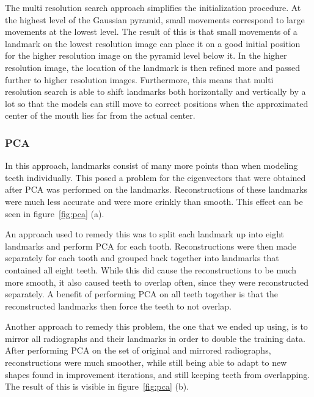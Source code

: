 \documentclass[a4paper]{article}
\begin{document}
The multi resolution search approach simplifies the initialization procedure. 
At the highest level of the Gaussian pyramid, small movements correspond to large movements at the lowest level. 
The result of this is that small movements of a landmark on the lowest resolution image can place it on a good initial position for the higher resolution image on the pyramid level below it. In the higher resolution image, the location of the landmark is then refined more and passed further to higher resolution images.
Furthermore, this means that multi resolution search is able to shift landmarks both horizontally and vertically by a lot so that the models can still move to correct positions when the approximated center of the mouth lies far from the actual center.

\subsubsection{PCA}
In this approach, landmarks consist of many more points than when modeling teeth individually. 
This posed a problem for the eigenvectors that were obtained after PCA was performed on the landmarks. 
Reconstructions of these landmarks were much less accurate and were more crinkly than smooth. 
This effect can be seen in figure~\ref{fig:pca} (a).
\bigskip

An approach used to remedy this was to split each landmark up into eight landmarks and perform PCA for each tooth. 
Reconstructions were then made separately for each tooth and grouped back together into landmarks that contained all eight teeth. 
While this did cause the reconstructions to be much more smooth, it also caused teeth to overlap often, since they were reconstructed separately. 
A benefit of performing PCA on all teeth together is that the reconstructed landmarks then force the teeth to not overlap. 
\bigskip

Another approach to remedy this problem, the one that we ended up using, is to mirror all radiographs and their landmarks in order to double the training data. 
After performing PCA on the set of original and mirrored radiographs, reconstructions were much smoother, while still being able to adapt to new shapes found in improvement iterations, and still keeping teeth from overlapping. The result of this is visible in figure~\ref{fig:pca} (b).
\end{document}
